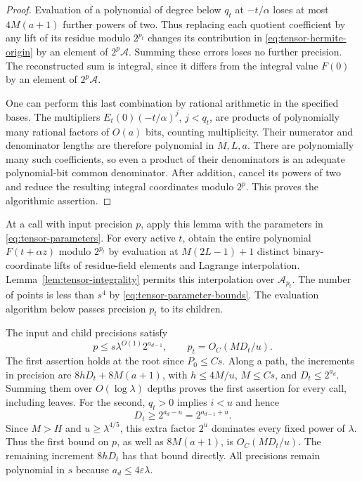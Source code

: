 \begin{proof}
Evaluation of a polynomial of degree below $q_t$ at $-t/\alpha$
loses at most $4M(a+1)$ further powers of two.  Thus replacing
each quotient coefficient by any lift of its residue modulo
$2^{p_t}$ changes its contribution in
\eqref{eq:tensor-hermite-origin} by an element of $2^p\mathcal A$.
Summing these errors loses no further precision.  The reconstructed
sum is integral, since it differs from the integral value $F(0)$
by an element of $2^p\mathcal A$.

One can perform this last combination by rational arithmetic in the
specified bases.  The multipliers $E_t(0)(-t/\alpha)^j$,
$j<q_t$, are products of polynomially many rational factors of
$O(a)$ bits, counting multiplicity.  Their numerator and denominator
lengths are therefore polynomial in $M,L,a$.  There are polynomially
many such coefficients, so even a product of their denominators is
an adequate polynomial-bit common denominator.  After addition,
cancel its powers of two and reduce the resulting integral
coordinates modulo $2^p$.  This proves the algorithmic assertion.
\end{proof}

At a call with input precision $p$, apply this lemma with the
parameters in \eqref{eq:tensor-parameters}.  For every active $t$,
obtain the entire polynomial $F(t+\alpha z)$ modulo $2^{p_t}$ by
evaluation at $M(2L-1)+1$ distinct binary-coordinate lifts of
residue-field elements and Lagrange interpolation.  Lemma~\ref{lem:tensor-integrality} permits this
interpolation over $\mathcal A_{p_t}$.  The number of points is
less than $s^4$ by \eqref{eq:tensor-parameter-bounds}.
The evaluation algorithm below passes precision $p_t$ to its
children.

The input and child precisions satisfy
\begin{equation}\label{eq:tensor-precision-bound}
 p\le s\lambda^{O(1)}2^{a_{d-1}},
 \qquad
 p_t=O_C(MD_t/u).
\end{equation}
The first assertion holds at the root since $P_0\le Cs$.
Along a path, the increments in precision are
$8hD_t+8M(a+1)$, with $h\le4M/u$, $M\le Cs$, and
$D_t\le2^{a_d}$.  Summing them over $O(\log\lambda)$ depths
proves the first assertion for every call, including leaves.
For the second, $q_t>0$ implies $i<u$ and hence
\[
 D_t\ge2^{a_d-u}=2^{a_{d-1}+u}.
\]
Since $M>H$ and $u\ge\lambda^{4/5}$, this extra factor $2^u$
dominates every fixed power of $\lambda$.  Thus the first bound
on $p$, as well as $8M(a+1)$, is $O_C(MD_t/u)$.
The remaining increment $8hD_t$ has that bound directly.
All precisions remain polynomial in $s$ because
$a_d\le4\varepsilon\lambda$.

